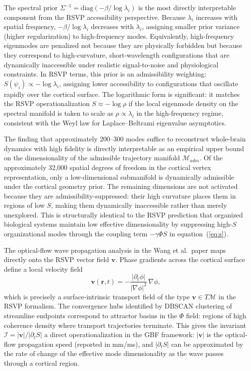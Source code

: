 \documentclass[11pt,a4paper]{article}
\theoremstyle{plain}
\theoremstyle{definition}
\begin{document}
The spectral prior $\Sigma^{-1} = \mathrm{diag}(-\beta/\log\lambda_i)$ is the most
directly interpretable component from the RSVP accessibility perspective. Because
$\lambda_i$ increases with spatial frequency, $-\beta/\log\lambda_i$ decreases with
$\lambda_i$, assigning smaller prior variance (higher regularization) to
high-frequency modes. Equivalently, high-frequency eigenmodes are penalized not
because they are physically forbidden but because they correspond to high-curvature,
short-wavelength configurations that are dynamically inaccessible under realistic
signal-to-noise and physiological constraints. In RSVP terms, this prior is an
admissibility weighting: $S(\psi_i) \propto -\log\lambda_i$, assigning lower
accessibility to configurations that oscillate rapidly over the cortical surface.
The logarithmic form is significant: it matches the RSVP operationalization
$S \approx -\log\rho$ if the local eigenmode density on the spectral manifold is
taken to scale as $\rho \propto \lambda_i$ in the high-frequency regime, consistent
with the Weyl law for Laplace--Beltrami eigenvalue asymptotics.

The finding that approximately 200--300 modes suffice to reconstruct whole-brain
dynamics with high fidelity is directly interpretable as an empirical upper bound on
the dimensionality of the admissible trajectory manifold $\mathcal{M}_{adm}$. Of the
approximately 32,000 spatial degrees of freedom in the cortical vertex representation,
only a low-dimensional submanifold is dynamically admissible under the cortical
geometry prior. The remaining dimensions are not activated because they are
admissibility-suppressed: their high curvature places them in regions of low $S$,
making them dynamically inaccessible rather than merely unexplored. This is
structurally identical to the RSVP prediction that organized biological systems
maintain low effective dimensionality by suppressing high-$S$ organizational modes
through the coupling term $-\gamma \Phi S$ in equation~(\ref{eq:s}).

The optical-flow wave propagation analysis in the Wang et al.\ paper maps directly
onto the RSVP vector field $\mathbf{v}$. Phase gradients across the cortical surface
define a local velocity field
\[
\mathbf{v}(\mathbf{r}, t) = -\frac{|\partial_t \phi|}{|\nabla \phi|^2}\,\nabla\phi,
\]
which is precisely a surface-intrinsic transport field of the type $\mathbf{v} \in
T\mathcal{M}$ in the RSVP formalism. The convergence hubs identified by DBSCAN
clustering of streamline endpoints correspond to attractor basins in the $\Phi$ field:
regions of high coherence density where transport trajectories terminate. This gives
the invariant $\mathcal{I} = |\mathbf{v}|/|\partial_t S|$ a direct operationalization
in the GBF framework: $|\mathbf{v}|$ is the optical-flow propagation speed (reported
in mm/ms), and $|\partial_t S|$ can be approximated by the rate of change of the
effective mode dimensionality as the wave passes through a cortical region.
\end{document}
